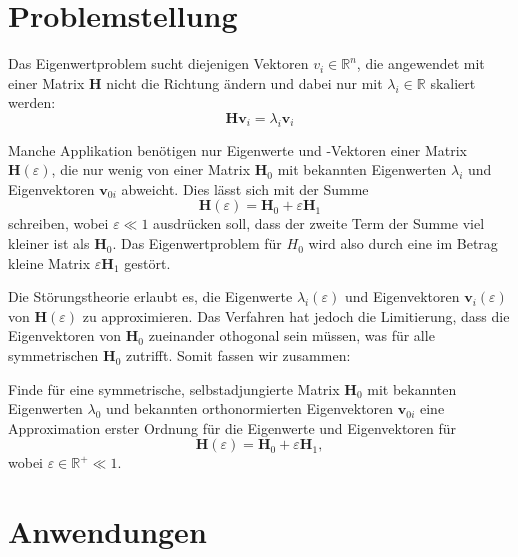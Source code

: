%
%
\section{Problemstellung
\label{ew:section:problemstellung}}

Das Eigenwertproblem sucht diejenigen Vektoren $v_i \in \mathbb{R}^{n} $, die angewendet mit einer Matrix $\bm H$ nicht die Richtung ändern und dabei nur mit $\lambda_i \in \mathbb{R}$ skaliert werden:
\begin{equation}
    \bm H \bm v_i = \lambda_i \bm v_i \label{ew:eq:eig}
\end{equation}

Manche Applikation benötigen nur Eigenwerte und -Vektoren einer Matrix $\bm H(\varepsilon)$, die nur wenig von einer Matrix $\bm H_0$ mit bekannten Eigenwerten $\lambda_{i}$ und Eigenvektoren $\bm v_{0i}$ abweicht.
Dies lässt sich mit der Summe
\begin{equation}
    \bm H(\varepsilon) = \bm H_0 + \varepsilon \bm H_1
\end{equation}
schreiben, wobei $\varepsilon \ll 1 $ ausdrücken soll, dass der zweite Term der Summe viel kleiner ist als $\bm H_0$.
Das Eigenwertproblem für $H_0$ wird also durch eine im Betrag kleine Matrix $ \varepsilon \bm H_1$ gestört.

Die Störungstheorie erlaubt es, die Eigenwerte $\lambda_i(\varepsilon)$ und Eigenvektoren  $\bm v_i(\varepsilon)$ von $\bm H(\varepsilon)$ zu approximieren.
Das Verfahren hat jedoch die Limitierung, dass die Eigenvektoren von $\bm H_0$ zueinander othogonal sein müssen, was für alle symmetrischen $\bm H_0$ zutrifft.
Somit fassen wir zusammen:
\begin{ewproblem*}
Finde für eine symmetrische, selbstadjungierte Matrix $\bm H_0$ mit bekannten Eigenwerten $\lambda_{0}$ und bekannten orthonormierten Eigenvektoren $\bm v_{0i}$ eine Approximation erster Ordnung für die Eigenwerte und Eigenvektoren für
\begin{equation*}
    \bm H(\varepsilon) = \bm H_0 + \varepsilon \bm H_1,
\end{equation*}
wobei $\varepsilon \in \mathbb{R^+} \ll 1$.
\end{ewproblem*}

\section{Anwendungen}

